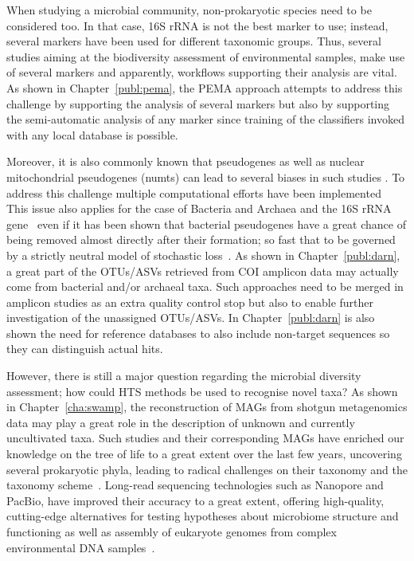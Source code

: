    When studying a microbial community, non-prokaryotic species need to be considered too. 
   In that case, 16S rRNA is not the best marker to use; instead, several markers 
   have been used for different taxonomic groups. 
   Thus, several studies aiming at the biodiversity assessment of environmental samples, 
   make use of several markers and apparently, workflows supporting their analysis are vital. 
   As shown in Chapter~\ref{publ:pema}, the PEMA approach attempts to address this challenge 
   by supporting the analysis of several markers but also by
   supporting the semi-automatic analysis of any marker since training of the classifiers invoked
   with any local database is possible. 

   Moreover, it is also commonly known that pseudogenes as well as 
   nuclear mitochondrial pseudogenes (numts) can lead to several biases in such studies \citep{song2008many}.
   To address this challenge multiple computational efforts have been implemented~\citep{porter2021profile}
   This issue also applies for the case of Bacteria and Archaea and the 16S rRNA gene~\citep{pei2010diversity}
   even if it has been shown that bacterial pseudogenes have a great chance of being removed almost directly after their formation;
   so fast that to be governed by a strictly neutral model of stochastic loss~\citep{kuo2010extinction}.
   As shown in Chapter~\ref{publ:darn}, a great part of the OTUs/ASVs retrieved from COI amplicon data
   may actually come from bacterial and/or archaeal taxa.
   Such approaches need to be merged in amplicon studies as an extra
   quality control stop but also to enable further investigation of the unassigned OTUs/ASVs. 
   In Chapter~\ref{publ:darn} is also shown the need for reference databases to also include non-target sequences 
   so they can distinguish actual hits. 

   However, there is still a major question regarding the microbial diversity assessment; 
   how could HTS methods be used to recognise novel taxa? 
   As shown in Chapter~\ref{cha:swamp}, the reconstruction of MAGs from shotgun metagenomics data
   may play a great role in the description of unknown and currently uncultivated taxa. 
   Such studies and their corresponding MAGs have enriched our knowledge on the tree of life to a great extent 
   over the last few years, uncovering several prokaryotic phyla, leading to 
   radical challenges on their taxonomy and the taxonomy scheme~\citep{parks_gtdb_2022}.
   Long-read sequencing technologies such as Nanopore and PacBio, have improved their accuracy to a great extent,
   offering high-quality, cutting-edge alternatives for testing hypotheses about microbiome structure 
   and functioning as well as assembly of eukaryote genomes from complex environmental DNA samples~\citep{tedersoo2021perspectives}.


